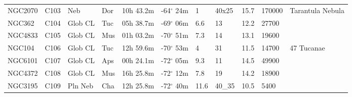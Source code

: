 \documentclass[10pt,twoside,a4paper,english]{article}
\begin{document}
\begin{longtable}{@{}lllllllllll@{}}
NGC2070    & C103          & Neb     & Dor & 10h 43.2m & -64$^{\circ}$ 24m & 1    & 40x25          & 15.7 & 170000        & Tarantula Nebula                \\ 
NGC362     & C104          & Glob CL & Tuc & 05h 38.7m & -69$^{\circ}$ 06m & 6.6  & 13             & 12.2 & 27700         &                                 \\ 
NGC4833    & C105          & Glob CL & Mus & 01h 03.2m & -70$^{\circ}$ 51m & 7.3  & 14             & 13.1 & 19600         &                                 \\ 
NGC104     & C106          & Glob CL & Tuc & 12h 59.6m & -70$^{\circ}$ 53m & 4    & 31             & 11.5 & 14700         & 47 Tucanae                      \\ 
NGC6101    & C107          & Glob CL & Aps & 00h 24.1m & -72$^{\circ}$ 05m & 9.3  & 11             & 14.5 & 49900         &                                 \\ 
NGC4372    & C108          & Glob CL & Mus & 16h 25.8m & -72$^{\circ}$ 12m & 7.8  & 19             & 14.2 & 18900         &                                 \\ 
NGC3195    & C109          & Pln Neb & Cha & 12h 25.8m & -72$^{\circ}$ 40m & 11.6 & 40\_35         & 10.5 & 5400          &                                 \\ 
\hline 
\end{longtable} 
 
 
\end{document}
